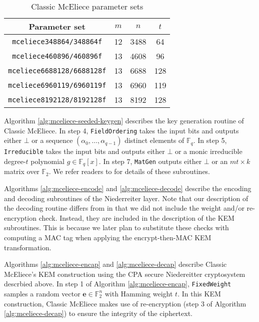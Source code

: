 \documentclass[runningheads]{llncs}
\begin{document}
\begin{table}
    \centering
    \begin{tabular}{|c|c|c|c|}
        \hline
        Parameter set & $m$ & $n$ & $t$ \\
        \hline
        \texttt{mceliece348864/348864f} & 12 & 3488 & 64 \\
        \hline
        \texttt{mceliece460896/460896f} & 13 & 4608 & 96 \\
        \hline
        \texttt{mceliece6688128/6688128f} & 13 & 6688 & 128 \\
        \hline
        \texttt{mceliece6960119/6960119f} & 13 & 6960 & 119 \\
        \hline
        \texttt{mceliece8192128/8192128f} & 13 & 8192 & 128 \\
        \hline
    \end{tabular}
    \caption{Classic McEliece parameter sets}\label{tab:mceliece-parameters}
\end{table}

Algorithm \ref{alg:mceliece-seeded-keygen} describes the key generation routine of Classic McEliece. In step 4, \texttt{FieldOrdering} takes the input bits and outputs either $\bot$ or a sequence $(\alpha_0, \ldots, \alpha_{q-1})$ distinct elements of $\mathbb{F}_q$. In step 5, \texttt{Irreducible}  takes the input bits and outputs either $\bot$ or a monic irreducible degree-$t$ polynomial $g \in \mathbb{F}_q[x]$. In step 7, \texttt{MatGen} outputs either $\bot$ or an $mt \times k$ matrix over $\mathbb{F}_2$. We refer readers to \cite{ClassicMcEliece2022} for details of these subroutines.

Algorithms \ref{alg:mceliece-encode} and \ref{alg:mceliece-decode} describe the encoding and decoding subroutines of the Niederreiter layer. Note that our description of the decoding routine differs from \cite{ClassicMcEliece2022} in that we did not include the weight and/or re-encryption check. Instead, they are included in the description of the KEM subroutines. This is because we later plan to substitute these checks with computing a MAC tag when applying the encrypt-then-MAC KEM transformation.

Algorithms \ref{alg:mceliece-encap} and \ref{alg:mceliece-decap} describe Classic McEliece's KEM construction using the CPA secure Niedereitter cryptosystem descrbied above. In step 1 of Algorithm \ref{alg:mceliece-encap}, \texttt{FixedWeight} samples a random vector $\mathbf{e}\in\mathbb{F}_2^n$ with Hamming weight $t$. In this KEM construction, Classic McEliece makes use of re-encryption (step 3 of Algorithm \ref{alg:mceliece-decap}) to ensure the integrity of the ciphertext.
\end{document}
